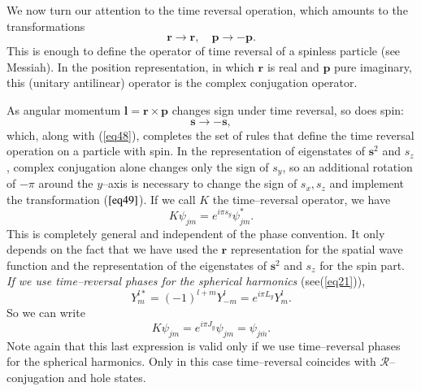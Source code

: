 \begin{subappendices}
We now turn our attention to the time reversal operation, which amounts to the transformations
\begin{equation}\label{eq48}
\mathbf{r} \rightarrow \mathbf{r}, \quad \mathbf{p} \rightarrow -\mathbf{p}.
\end{equation}
This is enough to define the operator of time reversal of a spinless particle (see Messiah). In the position representation, in which $\mathbf{r}$ is real and $\mathbf{p}$ pure imaginary, this (unitary antilinear) operator is the complex conjugation operator.


As angular momentum $\mathbf{l}=\mathbf{r}\times\mathbf{p}$ changes sign under time reversal, so does spin:
\begin{equation}\label{eq49}
\mathbf{s} \rightarrow -\mathbf{s},
\end{equation}
which, along with (\ref{eq48}), completes the set of rules that define the time reversal operation on a particle with spin. In the representation of eigenstates of $\mathbf{s}^2$ and $s_z$, complex conjugation alone changes only the sign of $s_y$, so an additional rotation of $-\pi$ around the $y$--axis is necessary to change the sign of $s_x,s_z$ and implement the transformation ($\ref{eq49}$). If we call $K$ the time--reversal operator, we have
\begin{equation}\label{eq50}
K \psi_{jm}=e^{i\pi s_y} \psi_{jm}^*.
\end{equation}
This is completely general and independent of the phase convention. It only depends on the fact that we have used the $\mathbf{r}$ representation for the spatial wave function and the representation of the eigenstates of $\mathbf{s}^2$ and $s_z$ for the spin part. \emph{If we use time--reversal phases for the spherical harmonics} (see(\ref{eq21})),
\begin{equation}\label{eq51}
Y_m^{l*}=(-1)^{l+m}Y_{-m}^{l}=e^{i\pi L_y} Y_{m}^{l}.
\end{equation}
So we can write
\begin{equation}\label{eq52}
K \psi_{jm}=e^{i\pi J_y}\psi_{jm}=\psi_{j\bar m}.
\end{equation}
Note again that this last expression is valid only if we use time--reversal phases for the spherical harmonics. Only in this case time--reversal coincides with $\mathcal{R}$--conjugation and hole states.



\end{subappendices}
